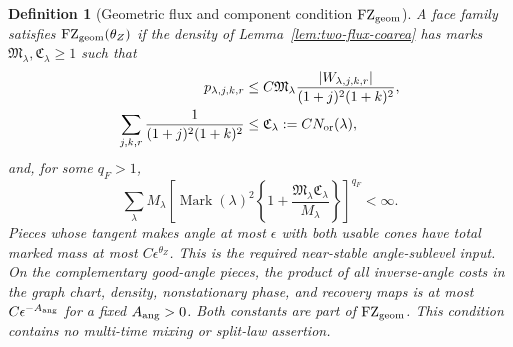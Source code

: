 \documentclass[11pt]{article}
\newtheorem{definition}[theorem]{Definition}
\begin{document}
\begin{definition}[Geometric flux and component condition
$\mathrm{FZ}_{\rm geom}$]
\label{def:flux-complexity}
A face family satisfies $\mathrm{FZ}_{\rm geom}(\theta_Z)$ if the density of
Lemma~\ref{lem:two-flux-coarea} has marks
$\mathfrak M_\lambda,\mathfrak C_\lambda\ge1$ such that
\begin{align}
 p_{\lambda,j,k,r}
 &\le C\mathfrak M_\lambda
 \frac{|W_{\lambda,j,k,r}|}{(1+j)^2(1+k)^2},
 \label{eq:radial-component-flux}\\
 \sum_{j,k,r}\frac1{(1+j)^2(1+k)^2}
 &\le\mathfrak C_\lambda:=CN_{\rm or}(\lambda),
 \label{eq:weighted-component-complexity}
\end{align}
and, for some $q_F>1$,
\begin{equation}
\label{eq:primitive-flux-ledger}
 \sum_\lambda M_\lambda
 \left[\operatorname{Mark}(\lambda)^2
 \left\{1+\frac{\mathfrak M_\lambda\mathfrak C_\lambda}
 {M_\lambda}\right\}\right]^{q_F}<\infty.
\end{equation}
Pieces whose tangent makes angle at most $\epsilon$ with both usable cones
have total marked mass at most $C\epsilon^{\theta_Z}$.  This is the required
near-stable angle-sublevel input.  On the complementary good-angle pieces,
the product of all inverse-angle costs in the graph chart, density,
nonstationary phase, and recovery maps is at most
$C\epsilon^{-A_{\rm ang}}$ for a fixed $A_{\rm ang}>0$.  Both constants are
part of $\mathrm{FZ}_{\rm geom}$.  This condition contains no multi-time
mixing or split-law assertion.
\end{definition}
\end{document}
